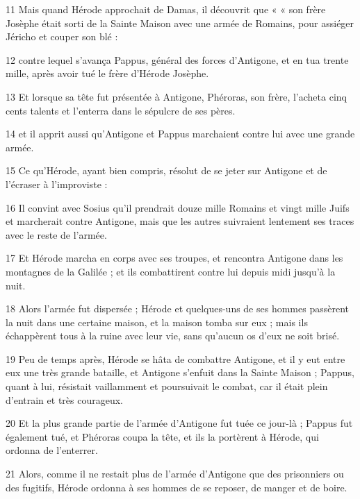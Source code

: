 \par 11 Mais quand Hérode approchait de Damas, il découvrit que « « son frère Josèphe était sorti de la Sainte Maison avec une armée de Romains, pour assiéger Jéricho et couper son blé :

\par 12 contre lequel s'avança Pappus, général des forces d'Antigone, et en tua trente mille, après avoir tué le frère d'Hérode Josèphe.

\par 13 Et lorsque sa tête fut présentée à Antigone, Phéroras, son frère, l'acheta cinq cents talents et l'enterra dans le sépulcre de ses pères.

\par 14 et il apprit aussi qu'Antigone et Pappus marchaient contre lui avec une grande armée.

\par 15 Ce qu'Hérode, ayant bien compris, résolut de se jeter sur Antigone et de l'écraser à l'improviste :

\par 16 Il convint avec Sosius qu'il prendrait douze mille Romains et vingt mille Juifs et marcherait contre Antigone, mais que les autres suivraient lentement ses traces avec le reste de l'armée.

\par 17 Et Hérode marcha en corps avec ses troupes, et rencontra Antigone dans les montagnes de la Galilée ; et ils combattirent contre lui depuis midi jusqu'à la nuit.

\par 18 Alors l'armée fut dispersée ; Hérode et quelques-uns de ses hommes passèrent la nuit dans une certaine maison, et la maison tomba sur eux ; mais ils échappèrent tous à la ruine avec leur vie, sans qu'aucun os d'eux ne soit brisé.

\par 19 Peu de temps après, Hérode se hâta de combattre Antigone, et il y eut entre eux une très grande bataille, et Antigone s'enfuit dans la Sainte Maison ; Pappus, quant à lui, résistait vaillamment et poursuivait le combat, car il était plein d'entrain et très courageux.

\par 20 Et la plus grande partie de l'armée d'Antigone fut tuée ce jour-là ; Pappus fut également tué, et Phéroras coupa la tête, et ils la portèrent à Hérode, qui ordonna de l'enterrer.

\par 21 Alors, comme il ne restait plus de l'armée d'Antigone que des prisonniers ou des fugitifs, Hérode ordonna à ses hommes de se reposer, de manger et de boire.

